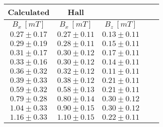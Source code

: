 \documentclass{report}
\begin{document}
\begin{center}
  \begin{tabular}{|c||c|c|c|c|} \hline
    Calculated & Hall &\\ \hline
    $B_x \ [mT]$ & $B_x \ [mT]$ & $B_z \ [mT]$ \\ \hline
    $ 0.27 \pm 0.17 $ & $ 0.27 \pm 0.11 $ & $ 0.13 \pm 0.11 $ \\ \hline
    $ 0.29 \pm 0.19 $ & $ 0.28 \pm 0.11 $ & $ 0.15 \pm 0.11 $ \\ \hline
    $ 0.31 \pm 0.17 $ & $ 0.30 \pm 0.12 $ & $ 0.17 \pm 0.11 $ \\ \hline
    $ 0.33 \pm 0.16 $ & $ 0.30 \pm 0.12 $ & $ 0.14 \pm 0.11 $ \\ \hline
    $ 0.36 \pm 0.32 $ & $ 0.32 \pm 0.12 $ & $ 0.11 \pm 0.11 $ \\ \hline
    $ 0.39 \pm 0.33 $ & $ 0.38 \pm 0.12 $ & $ 0.21 \pm 0.11 $ \\ \hline
    $ 0.59 \pm 0.32 $ & $ 0.58 \pm 0.13 $ & $ 0.21 \pm 0.11 $ \\ \hline
    $ 0.79 \pm 0.28 $ & $ 0.80 \pm 0.14 $ & $ 0.30 \pm 0.12 $ \\ \hline
    $ 1.04 \pm 0.33 $ & $ 0.90 \pm 0.15 $ & $ 0.30 \pm 0.12 $ \\ \hline
    $ 1.16 \pm 0.33 $ & $ 1.10 \pm 0.15 $ & $ 0.22 \pm 0.11 $ \\ \hline
  \end{tabular}
\end{center}
\end{document}
